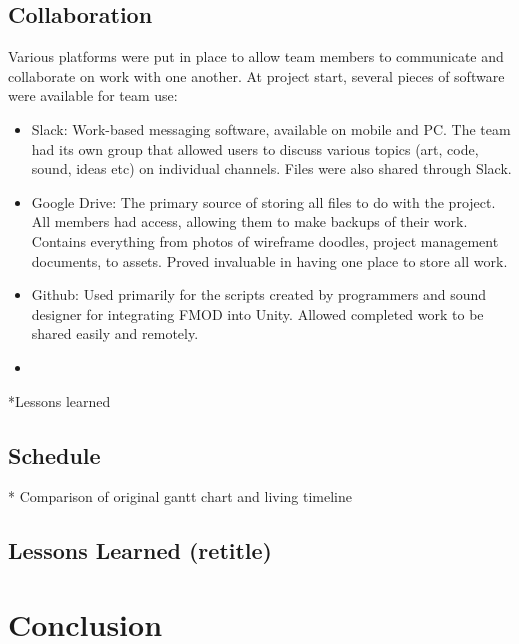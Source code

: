 \documentclass[12pt]{article}
\begin{document}
\subsection{Collaboration}
Various platforms were put in place to allow team members to communicate and collaborate on work with one another. At project start, several pieces of software were available for team use: 
\begin{itemize}
	\item Slack: Work-based messaging software, available on mobile and PC. The team had its own group that allowed users to discuss various topics (art, code, sound, ideas etc) on individual channels. Files were also shared through Slack. 
	\item Google Drive: The primary source of storing all files to do with the project. All members had access, allowing them to make backups of their work. Contains everything from photos of wireframe doodles, project management documents, to assets. Proved invaluable in having one place to store all work.
	\item Github: Used primarily for the scripts created by programmers and sound designer for integrating FMOD into Unity. Allowed completed work to be shared easily and remotely. 
	\item 
\end{itemize}

*Lessons learned
\subsection{Schedule} 
* Comparison of original gantt chart and living timeline

\subsection{Lessons Learned (retitle)}
\section{Conclusion}
\end{document}
